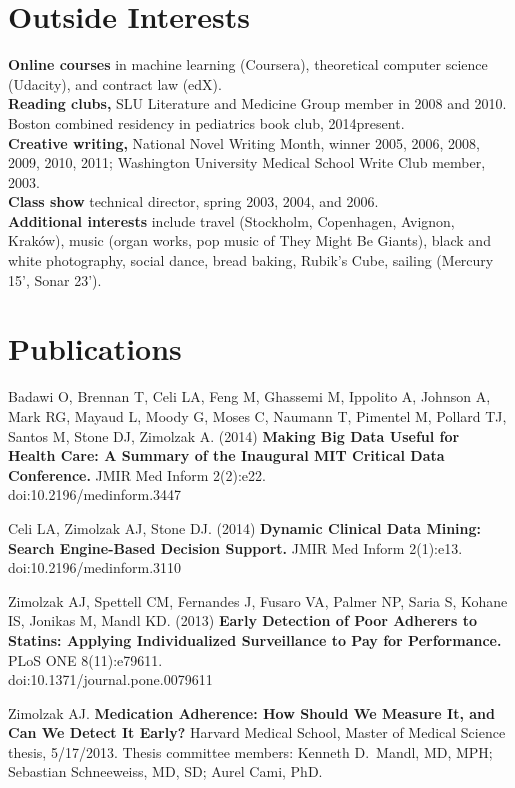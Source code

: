 \documentclass[12pt]{article}
\begin{document}
\section*{Outside Interests}

\textbf{Online courses} in machine learning (Coursera), theoretical
computer science (Udacity), and contract law (edX).\\
\textbf{Reading clubs,} SLU Literature and Medicine Group member in
2008 and 2010. Boston combined residency in pediatrics book club,
2014\ndash{}present.\\
\textbf{Creative writing,} National Novel Writing Month, winner 2005, 2006,
2008, 2009, 2010, 2011; Washington University Medical School Write Club
member, 2003.\\
\textbf{Class show} technical director, spring 2003, 2004, and 2006.\\
\textbf{Additional interests} include travel (Stockholm, Copenhagen,
Avignon, Krak\'ow), music (organ works, pop music of They Might Be
Giants), black and white photography, social dance, bread baking,
Rubik's Cube, sailing (Mercury 15', Sonar 23').

\section*{Publications}
Badawi O, Brennan T, Celi LA, Feng M, Ghassemi M, Ippolito A, Johnson
A, Mark RG, Mayaud L, Moody G, Moses C, Naumann T, Pimentel M, Pollard
TJ, Santos M, Stone DJ, Zimolzak A. (2014) \textbf{Making Big Data
  Useful for Health Care: A Summary of the Inaugural MIT Critical Data
  Conference.} JMIR Med Inform 2(2):e22.\\
doi:10.2196/medinform.3447

Celi LA, Zimolzak AJ, Stone DJ. (2014) \textbf{Dynamic Clinical Data
  Mining: Search Engine-Based Decision Support.} JMIR Med Inform
2(1):e13.\\
doi:10.2196/medinform.3110

Zimolzak AJ, Spettell CM, Fernandes J, Fusaro VA, Palmer NP, Saria S,
Kohane IS, Jonikas M, Mandl KD. (2013) \textbf{Early Detection of Poor
  Adherers to Statins: Applying Individualized Surveillance to Pay for
  Performance.} PLoS ONE 8(11):e79611. \\
doi:10.1371/journal.pone.0079611

Zimolzak AJ. \textbf{Medication Adherence: How Should We Measure It, and Can
We Detect It Early?} Harvard Medical School, Master of Medical Science
thesis, 5/17/2013. Thesis committee members: Kenneth D.\ Mandl, MD,
MPH; Sebastian Schneeweiss, MD, SD; Aurel Cami, PhD.
\end{document}
